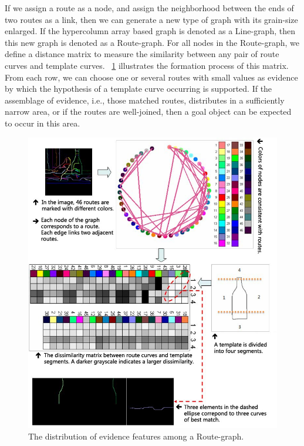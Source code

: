 \documentclass[journal]{IEEEtran}
\begin{document}
If we assign a route as a node, and assign the neighborhood between the ends of two routes as a link, 
then we can generate a new type of graph with its grain-size enlarged. 
If the hypercolumn array based graph is denoted as a Line-graph, then this new graph is denoted as a Route-graph. 
For all nodes in the Route-graph, we define a distance matrix to measure the similarity between any pair of route curves and template curves. 
\figurename~\ref{fig:15} illustrates the formation process of this matrix. 
From each row, we can choose one or several routes with small values as evidence by which the hypothesis of a template curve occurring is supported. 
If the assemblage of evidence, i.e., those matched routes, distributes in a sufficiently narrow area, 
or if the routes are well-joined, then a goal object can be expected to occur in this area.

\begin{figure}[!t]
\centering
\includegraphics[width=0.98\linewidth]{images/fig15.jpg}
\caption{The distribution of evidence features among a Route-graph.}
\label{fig:15}
\end{figure}
\end{document}
